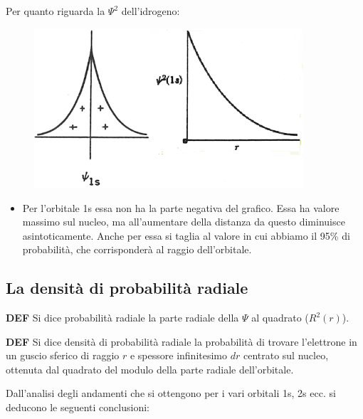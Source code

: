 Per quanto riguarda la $\Psi^2$ dell'idrogeno:

\begin{figure}[htp]
  \centering
  \includegraphics[width=10cm]{immagini/orbitale psi quadro idrogeno.png}
\end{figure}

\begin{itemize}
  \item Per l'orbitale 1s essa non ha la parte negativa del grafico. Essa ha valore massimo sul nucleo, ma all'aumentare della distanza da questo diminuisce asintoticamente. Anche per essa si taglia al valore in cui abbiamo il 95\% di probabilità, che corrisponderà al raggio dell'orbitale.
\end{itemize}

\subsection{La densità di probabilità radiale}
\vspace{0.2cm}\textbf{DEF} Si dice probabilità radiale la parte radiale della $\Psi$ al quadrato ($R^2(r)$).

\vspace{0.2cm}\textbf{DEF} Si dice densità di probabilità radiale la probabilità di trovare l'elettrone in un guscio sferico di raggio $r$ e spessore infinitesimo $dr$
centrato sul nucleo, ottenuta dal quadrato del modulo della parte radiale dell'orbitale. 

\vspace{0.2cm}Dall'analisi degli andamenti che si ottengono per i vari orbitali 1s, 2s ecc. si deducono le seguenti conclusioni:

